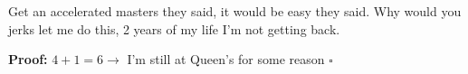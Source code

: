 {}

Get an accelerated masters they said, it would be easy they said. 
Why would you jerks let me do this, 2 years of my life I'm not getting back.

\textbf{Proof:} $4+1=6 \rightarrow$
I'm still at Queen's for some reason
$\square$

\clearpage %